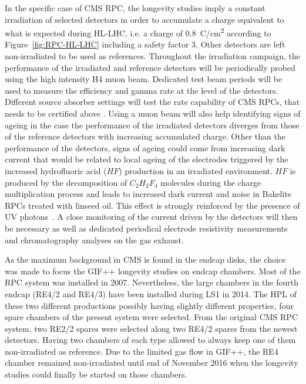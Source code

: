 	In the specific case of CMS RPC, the longevity studies imply a constant irradiation of selected detectors in order to accumulate a charge equivalent to what is expected during HL-LHC, i.e. a charge of \SI{0.8}{C/cm^2} according to Figure~\ref{fig:RPC-HL-LHC} including a safety factor 3. Other detectors are left non-irradiated to be used as references. Throughout the irradiation campaign, the performance of the irradiated and reference detectors will be periodically probed using the high intensity H4 muon beam. Dedicated test beam periods will be used to measure the efficiency and gamma rate at the level of the detectors. Different source absorber settings will test the rate capability of CMS RPCs, that needs to be certified above . Using a muon beam will also help identifying signs of ageing in the case the performance of the irradiated detectors diverges from those of the reference detectors with increasing accumulated charge. Other than the performance of the detectors, signs of ageing could come from increasing dark current that would be related to local ageing of the electrodes triggered by the increased hydrofluoric acid ($HF$) production in an irradiated environment. $HF$ is produced by the decomposition of $C_2H_2F_4$ molecules during the charge multiplication process and leads to increased dark current and noise in Bakelite RPCs treated with linseed oil. This effect is strongly reinforced by the presence of UV photons~\cite{GUIDA2008,BELLINI2008}. A close monitoring of the current driven by the detectors will then be necessary as well as dedicated periodical electrode resistivity measurements and chromatography analyses on the gas exhaust.
	
    As the maximum background in CMS is found in the endcap disks, the choice was made to focus the GIF++ longevity studies on endcap chambers. Most of the RPC system was installed in 2007. Nevertheless, the large chambers in the fourth endcap (RE4/2 and RE4/3) have been installed during LS1 in 2014. The HPL of these two different productions possibly having slightly different properties, four spare chambers of the present system were selected. From the original CMS RPC system, two RE2/2 spares were selected along two RE4/2 spares from the newest detectors. Having two chambers of each type allowed to always keep one of them non-irradiated as reference. Due to the limited gas flow in GIF++, the RE4 chamber remained non-irradiated until end of November 2016 when the longevity studies could finally be started on those chambers.
    

